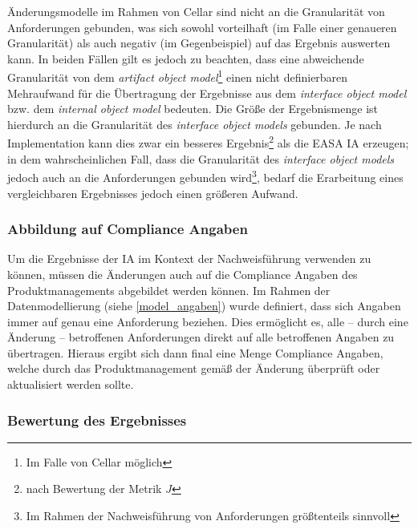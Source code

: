 \medskip
Änderungsmodelle im Rahmen von Cellar sind nicht an die Granularität von Anforderungen gebunden, was sich sowohl vorteilhaft (im Falle einer genaueren Granularität) als auch negativ (im Gegenbeispiel) auf das Ergebnis auswerten kann.
In beiden Fällen gilt es jedoch zu beachten, dass eine abweichende Granularität von dem \textit{artifact object model}\footnote{Im Falle von Cellar möglich} einen nicht definierbaren Mehraufwand für die Übertragung der Ergebnisse aus dem \textit{interface object model} bzw. dem \textit{internal object model} bedeuten.
Die Größe der Ergebnismenge ist hierdurch an die Granularität des \textit{interface object models} gebunden. 
Je nach Implementation kann dies zwar ein besseres Ergebnis\footnote{nach Bewertung der Metrik $J$} als die \ac{EASA} \ac{IA} erzeugen; in dem wahrscheinlichen Fall, dass die Granularität des \textit{interface object models} jedoch auch an die Anforderungen gebunden wird\footnote{Im Rahmen der Nachweisführung von \atmans Anforderungen größtenteils sinnvoll}, bedarf die Erarbeitung eines vergleichbaren Ergebnisses jedoch einen größeren Aufwand.  

\subsubsection{Abbildung auf Compliance Angaben}

Um die Ergebnisse der \ac{IA} im Kontext der Nachweisführung verwenden zu können, müssen die Änderungen auch auf die Compliance Angaben des Produktmanagements abgebildet werden können.
Im Rahmen der Datenmodellierung (siehe \ref{model_angaben}) wurde definiert, dass sich Angaben immer auf genau eine Anforderung beziehen. 
Dies ermöglicht es, alle -- durch eine Änderung -- betroffenen Anforderungen direkt auf alle betroffenen Angaben zu übertragen.
Hieraus ergibt sich dann final eine Menge Compliance Angaben, welche durch das Produktmanagement gemäß der Änderung überprüft oder aktualisiert werden sollte.

\pagebreak
\subsubsection{Bewertung des Ergebnisses}

